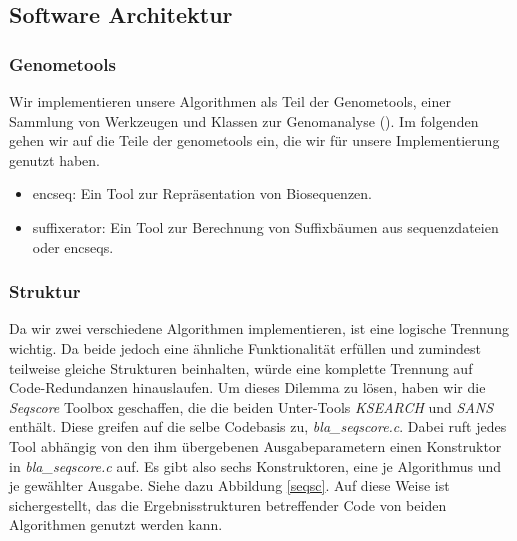 \documentclass{article}
\begin{document}

\subsection{Software Architektur}

\subsubsection{Genometools}

Wir implementieren unsere Algorithmen als Teil der Genometools, einer Sammlung von Werkzeugen und Klassen zur Genomanalyse (\cite{gtools}).
Im folgenden gehen wir auf die Teile der genometools ein, die wir für unsere Implementierung genutzt haben.
\begin{itemize}
  \item encseq: Ein Tool zur Repräsentation von Biosequenzen.
  \item suffixerator: Ein Tool zur Berechnung von Suffixbäumen aus sequenzdateien oder encseqs.
\end{itemize}

\subsubsection{Struktur}

Da wir zwei verschiedene Algorithmen implementieren, ist eine logische Trennung wichtig. Da beide jedoch eine ähnliche Funktionalität erfüllen und
zumindest teilweise gleiche Strukturen beinhalten, würde eine komplette Trennung auf Code-Redundanzen hinauslaufen. Um dieses Dilemma zu lösen, haben wir
die \emph{Seqscore} Toolbox geschaffen, die die beiden Unter-Tools \emph{KSEARCH} und \emph{SANS} enthält. Diese greifen auf die selbe Codebasis zu, 
\emph{bla\_seqscore.c}. Dabei ruft jedes Tool abhängig von den ihm übergebenen Ausgabeparametern einen Konstruktor in \emph{bla\_seqscore.c} auf. Es gibt also
sechs Konstruktoren, eine je Algorithmus und je gewählter Ausgabe. Siehe dazu Abbildung \ref{seqsc}. Auf diese Weise ist sichergestellt, das die 
Ergebnisstrukturen betreffender Code von beiden Algorithmen genutzt werden kann.
\end{document}
